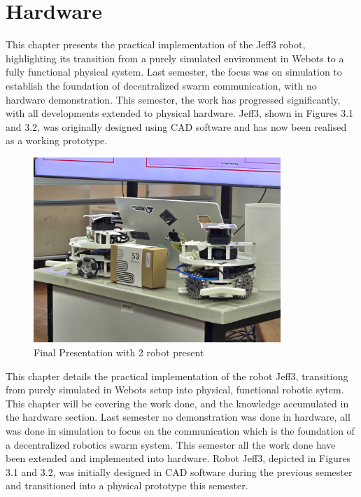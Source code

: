 \chapter{Hardware}
This chapter presents the practical implementation of the Jeff3 robot, highlighting its transition from a purely simulated environment in Webots to a fully functional physical system. Last semester, the focus was on simulation to establish the foundation of decentralized swarm communication, with no hardware demonstration. This semester, the work has progressed significantly, with all developments extended to physical hardware. Jeff3, shown in Figures 3.1 and 3.2, was originally designed using CAD software and has now been realised as a working prototype.
\begin{figure} [H]
    \centering
    \includegraphics[height=7cm]{assets/images/hardware/irl-2-robots.jpeg}
    \caption{Final Presentation with 2 robot present}
    \label{fig:2-robot-present}
\end{figure}
This chapter details the practical implementation of the robot Jeff3, transitiong from purely simulated in Webots setup into physical, functional robotic sytem.
This chapter will be covering the work done, and the knowledge accumulated in the hardware section. Last semester no demonstration was done in hardware, all was done in simulation to focus on the communication which is the foundation of a decentralized robotics swarm system. This semester all the work done have been extended and implemented into hardware. Robot Jeff3, depicted in Figures 3.1 and 3.2, was initially designed in CAD software during the previous semester and transitioned into a physical prototype this semester.


